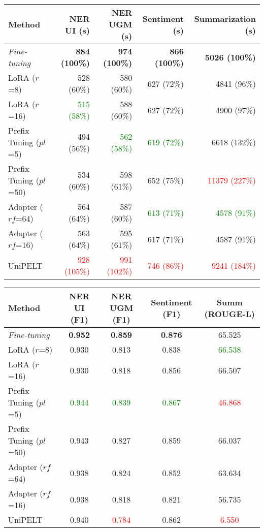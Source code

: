 \begin{table*}[!ht]
    \centering
    \caption{Average Training Runtime (Top) \& Performance Metrics (Bottom)}
    \label{table:runtime-performance}
    \begin{tabular}{l|r|r|r|r}
        \toprule
        \textbf{Method} & \textbf{NER UI (s)} & \textbf{NER UGM (s)} & \textbf{Sentiment (s)} & \textbf{Summarization (s)} \\
        \midrule
        \textit{Fine-tuning} & \textbf{884 (100\%)} & \textbf{974 (100\%)} & \textbf{866 (100\%)} & \textbf{5026 (100\%)} \\
        LoRA ($r$=8) & 528 (60\%) & 580 (60\%) & 627 (72\%) & 4841 (96\%) \\
        LoRA ($r$=16) & \textcolor{Green}{515 (58\%)} & 588 (60\%) & 627 (72\%) & 4900 (97\%) \\
        Prefix Tuning ($pl$=5) & 494 (56\%) & \textcolor{Green}{562 (58\%)} & \textcolor{Green}{619 (72\%)} & 6618 (132\%) \\
        Prefix Tuning ($pl$=50) & 534 (60\%) & 598 (61\%) & 652 (75\%) & \textcolor{Red}{11379 (227\%)} \\
        Adapter ($rf$=64) & 564 (64\%) & 587 (60\%) & \textcolor{Green}{613 (71\%)} & \textcolor{Green}{4578 (91\%)} \\
        Adapter ($rf$=16) & 563 (64\%) & 595 (61\%) & 617 (71\%) & 4587 (91\%) \\
        UniPELT & \textcolor{Red}{928 (105\%)} & \textcolor{Red}{991 (102\%)} & \textcolor{Red}{746 (86\%)} & \textcolor{Red}{9241 (184\%)} \\
        \bottomrule
    \end{tabular}

    \vspace{0.5cm}

    \begin{tabular}{l|c|c|c|c}
        \toprule
        \textbf{Method} & \textbf{NER UI (F1)} & \textbf{NER UGM (F1)} & \textbf{Sentiment (F1)} & \textbf{Summ (ROUGE-L)} \\
        \midrule
        \textit{Fine-tuning} & \textbf{0.952} & \textbf{0.859} & \textbf{0.876} & 65.525 \\
        LoRA ($r$=8) & 0.930 & 0.813 & 0.838 & \textcolor{Green}{66.538} \\
        LoRA ($r$=16) & 0.930 & 0.818 & 0.856 & 66.507 \\
        Prefix Tuning ($pl$=5) & \textcolor{Green}{0.944} & \textcolor{Green}{0.839} & \textcolor{Green}{0.867} & \textcolor{Red}{46.868} \\
        Prefix Tuning ($pl$=50) & 0.943 & 0.827 & 0.859 & 66.037 \\
        Adapter ($rf$=64) & 0.938 & 0.824 & 0.852 & 63.634 \\
        Adapter ($rf$=16) & 0.938 & 0.818 & 0.821 & 56.735 \\
        UniPELT & 0.940 & \textcolor{Red}{0.784} & 0.862 & \textcolor{Red}{6.550} \\
        \bottomrule
    \end{tabular}
\end{table*}

